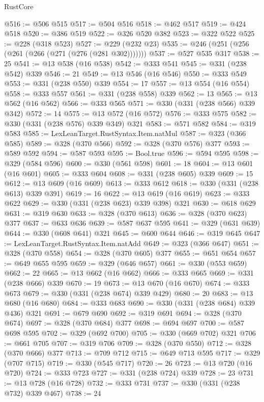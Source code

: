 \begin{lexlean}{RustCore}
\begin{coremodule}
@516 := @506 @515
@517 := @504 @516
@518 := @462 @517
@519 := @424 @518
@520 := @386 @519
@522 := @326 @520 @382
@523 := @322 @522
@525 := @228 (@318 @523)
@527 := @229 (@232 @23)
@535 := @246 (@251 (@256 (@261 (@266 (@271 (@276 (@281 @302)))))))
@537 := @527 @535 @317
@538 := 25
@541 := @13 @538 (@16 @538)
@542 := @333 @541
@545 := @331 (@238 @542) @339
@546 := 21
@549 := @13 @546 (@16 @546)
@550 := @333 @549
@553 := @331 (@238 @550) @339
@554 := 17
@557 := @13 @554 (@16 @554)
@558 := @333 @557
@561 := @331 (@238 @558) @339
@562 := 13
@565 := @13 @562 (@16 @562)
@566 := @333 @565
@571 := @330 (@331 (@238 @566) @339 @342)
@572 := 14
@575 := @13 @572 (@16 @572)
@576 := @333 @575
@582 := @330 (@331 (@238 @576) @339 @349) @321
@583 := @571 @582
@584 := @319 @583
@585 := LexLeanTarget.RustSyntax.Item.natMul
@587 := @323 (@366 @585)
@589 := @328 (@370 @566)
@592 := @328 (@370 @576) @377
@593 := @589 @592
@594 := @587 @593
@595 := Bool.true
@596 := @594 @595
@598 := @329 (@584 @596)
@600 := @330 (@561 @598)
@601 := 18
@604 := @13 @601 (@16 @601)
@605 := @333 @604
@608 := @331 (@238 @605) @339
@609 := 15
@612 := @13 @609 (@16 @609)
@613 := @333 @612
@618 := @330 (@331 (@238 @613) @339 @391)
@619 := 16
@622 := @13 @619 (@16 @619)
@623 := @333 @622
@629 := @330 (@331 (@238 @623) @339 @398) @321
@630 := @618 @629
@631 := @319 @630
@633 := @328 (@370 @613)
@636 := @328 (@370 @623) @377
@637 := @633 @636
@639 := @587 @637 @595
@641 := @329 (@631 @639)
@644 := @330 (@608 @641) @321
@645 := @600 @644
@646 := @319 @645
@647 := LexLeanTarget.RustSyntax.Item.natAdd
@649 := @323 (@366 @647)
@651 := @328 (@370 @558)
@654 := @328 (@370 @605) @377
@655 := @651 @654
@657 := @649 @655 @595
@659 := @329 (@646 @657)
@661 := @330 (@553 @659)
@662 := 22
@665 := @13 @662 (@16 @662)
@666 := @333 @665
@669 := @331 (@238 @666) @339
@670 := 19
@673 := @13 @670 (@16 @670)
@674 := @333 @673
@679 := @330 (@331 (@238 @674) @339 @429)
@680 := 20
@683 := @13 @680 (@16 @680)
@684 := @333 @683
@690 := @330 (@331 (@238 @684) @339 @436) @321
@691 := @679 @690
@692 := @319 @691
@694 := @328 (@370 @674)
@697 := @328 (@370 @684) @377
@698 := @694 @697
@700 := @587 @698 @595
@702 := @329 (@692 @700)
@705 := @330 (@669 @702) @321
@706 := @661 @705
@707 := @319 @706
@709 := @328 (@370 @550)
@712 := @328 (@370 @666) @377
@713 := @709 @712
@715 := @649 @713 @595
@717 := @329 (@707 @715)
@719 := @330 (@545 @717)
@720 := 26
@723 := @13 @720 (@16 @720)
@724 := @333 @723
@727 := @331 (@238 @724) @339
@728 := 23
@731 := @13 @728 (@16 @728)
@732 := @333 @731
@737 := @330 (@331 (@238 @732) @339 @467)
@738 := 24

\end{coremodule}
\end{lexlean}

